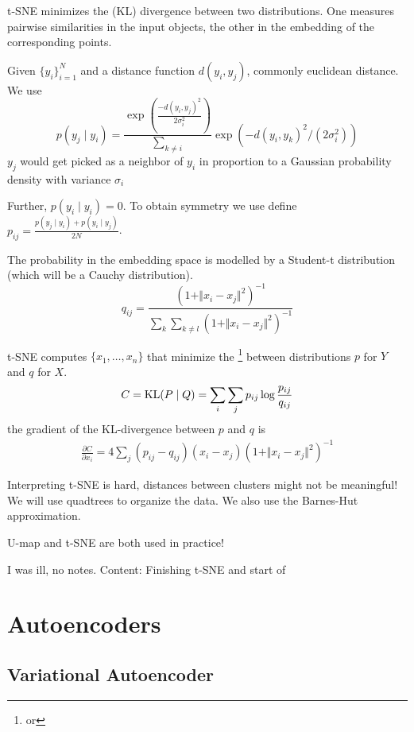 t-SNE minimizes the (KL) divergence between two distributions. One measures pairwise similarities in the input 
objects, the other in the embedding of the corresponding points. 

Given $\{y_i\}_{i=1}^N$ and a distance function $d(y_i,y_j)$, commonly euclidean distance. We use 
\[p(y_j\mid y_i)=\frac{\exp(\frac{-d(y_i,y_j)^2}{2\sigma_i^2})}{\sum_{k\neq i}}\exp(-d(y_i,y_k)^2/(2\sigma_i^2))\]
$y_j$ would get picked as a neighbor of $y_i$ in proportion to a Gaussian probability density with variance $\sigma_i$

Further, $p(y_i\mid y_i)=0$. To obtain symmetry we use define $p_{ij}=\frac{p(y_j\mid y_i)+p(y_i\mid y_j)}{2N}$.

The probability in the embedding space is modelled by a Student-t distribution (which will be a Cauchy distribution).
\[q_{ij}=\frac{(1+\Vert x_i-x_j\Vert^2)^{-1}}{\sum_{k}\sum_{k\neq l}(1+\Vert x_i-x_j\Vert^2)^{-1}}\]

t-SNE computes $\{x_1,\dots,x_n\}$ that minimize the \footnote{or } between distributions $p$ for $Y$ and $q$ for $X$.
\[C={\text{KL}}(P\mid Q)=\sum_{i}\sum_{j}p_{ij}\log\frac{p_{ij}}{q_{ij}}\]
the gradient of the KL-divergence between $p$ and $q$ is 
\begin{align*}
    \frac{\partial C}{\partial x_i}=4\sum_{j}(p_{ij}-q_{ij}) (x_i-x_j)(1+\Vert x_i-x_j\Vert^2)^{-1}
\end{align*}

\begin{aremark}
    Interpreting t-SNE is hard, distances between clusters might not be meaningful! We will use quadtrees to organize the data. We also use the Barnes-Hut approximation.
\end{aremark}

\begin{aremark}
    U-map and t-SNE are both used in practice!
\end{aremark}


I was ill, no notes. Content: Finishing t-SNE and start of 

\section{Autoencoders}



\subsection{Variational Autoencoder}

